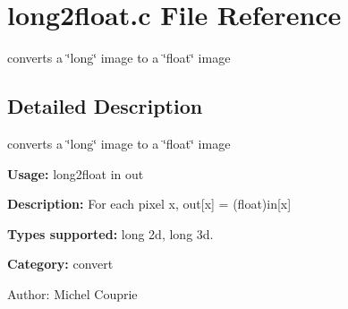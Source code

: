 \section{long2float.c File Reference}
\label{long2float_8c}
converts a \char`\"{}long\char`\"{} image to a \char`\"{}float\char`\"{} image  




\label{_details}
\subsection{Detailed Description}
converts a \char`\"{}long\char`\"{} image to a \char`\"{}float\char`\"{} image 

{\bf Usage:} long2float in out

{\bf Description:} For each pixel x, out[x] = (float)in[x]

{\bf Types supported:} long 2d, long 3d.

{\bf Category:} convert

\begin{Desc}
\item[Author:]Michel Couprie \end{Desc}
